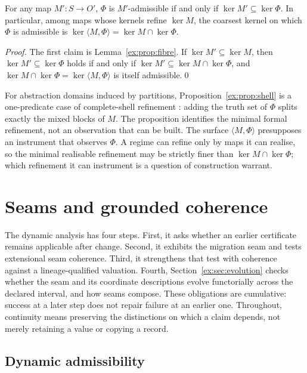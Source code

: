 \documentclass[smallextended,envcountsect,envcountsame,natbib]{svjour3}
\begin{document}
\begin{proposition}\label{ex:prop:shell}
For any map $M':S\to O'$, $\Phi$ is $M'$-admissible if and only if $\ker M' \subseteq \ker \Phi$. In particular, among maps whose kernels refine $\ker M$, the coarsest kernel on which $\Phi$ is admissible is $\ker \langle M,\Phi \rangle=\ker M \cap \ker \Phi$.
\end{proposition}

\begin{proof}
The first claim is Lemma~\ref{ex:prop:fibre}. If $\ker M' \subseteq \ker M$, then $\ker M' \subseteq \ker \Phi$ holds if and only if $\ker M' \subseteq \ker M \cap \ker \Phi$, and $\ker M \cap \ker \Phi=\ker \langle M,\Phi \rangle$ is itself admissible.\qed
\end{proof}

For abstraction domains induced by partitions, Proposition~\ref{ex:prop:shell} is a one-predicate case of complete-shell refinement \citep{giacobazziranzatoscozzari2000,ranzatotapparo2004}: adding the truth set of $\Phi$ splits exactly the mixed blocks of $M$. The proposition identifies the minimal formal refinement, not an observation that can be built. The surface $\langle M,\Phi \rangle$ presupposes an instrument that observes $\Phi$. A regime can refine only by maps it can realise, so the minimal realisable refinement may be strictly finer than $\ker M\cap\ker\Phi$; which refinement it can instrument is a question of construction warrant.


\section{Seams and grounded coherence}\label{ex:sec:seams}\label{ch:change}

The dynamic analysis has four steps. First, it asks whether an earlier certificate remains applicable after change. Second, it exhibits the migration seam and tests extensional seam coherence. Third, it strengthens that test with coherence against a lineage-qualified valuation. Fourth, Section~\ref{ex:sec:evolution} checks whether the seam and its coordinate descriptions evolve functorially across the declared interval, and how seams compose. These obligations are cumulative: success at a later step does not repair failure at an earlier one. Throughout, continuity means preserving the distinctions on which a claim depends, not merely retaining a value or copying a record.

\subsection{Dynamic admissibility}\label{ex:sec:dynamic}
\end{document}
